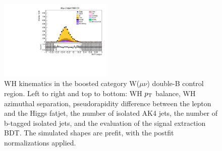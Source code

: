 \begin{figure}[tbp]
\begin{center}
    \includegraphics[width=0.48\textwidth]{figures/wlnhbb2016/boosted/WmnWHTT2bFJCR_bdtValue.pdf}
    \caption{WH kinematics in the boosted category W($\mu\nu$) double-B control region.
    Left to right and top to bottom: WH $p_{\mathrm{T}}$ balance, WH azimuthal separation,
    pseudorapidity difference between the lepton and the Higgs fatjet,
    the number of isolated AK4 jets, the number of b-tagged isolated jets,
    and the evaluation of the signal extraction BDT.
    The simulated shapes are prefit, with the postfit normalizations applied.}
    \label{fig:boost_WmnTT2b_WH}
  \end{center}
\end{figure}
\clearpage

